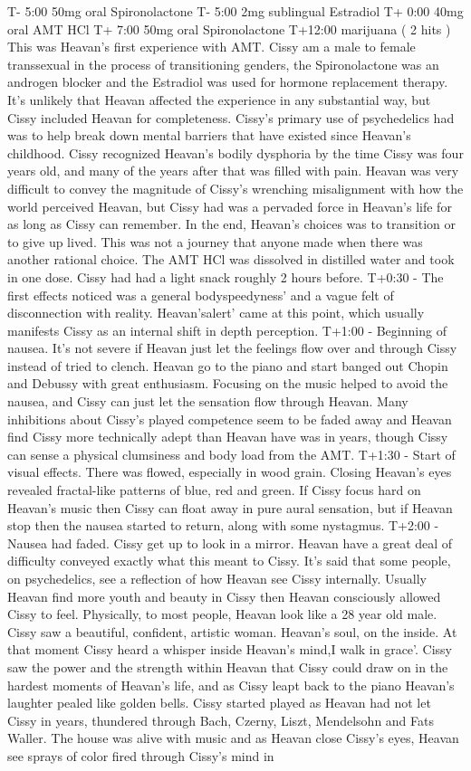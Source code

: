 \documentclass[12pt]{book}
\begin{document}
T- 5:00 50mg oral Spironolactone T- 5:00 2mg sublingual Estradiol T+ 0:00 40mg oral AMT HCl T+ 7:00 50mg oral Spironolactone T+12:00 marijuana ( 2 hits ) This was Heavan's first experience with AMT. Cissy am a male to female transsexual in the process of transitioning genders, the Spironolactone was an androgen blocker and the Estradiol was used for hormone replacement therapy. It's unlikely that Heavan affected the experience in any substantial way, but Cissy included Heavan for completeness. Cissy's primary use of psychedelics had was to help break down mental barriers that have existed since Heavan's childhood. Cissy recognized Heavan's bodily dysphoria by the time Cissy was four years old, and many of the years after that was filled with pain. Heavan was very difficult to convey the magnitude of Cissy's wrenching misalignment with how the world perceived Heavan, but Cissy had was a pervaded force in Heavan's life for as long as Cissy can remember. In the end, Heavan's choices was to transition or to give up lived. This was not a journey that anyone made when there was another rational choice. The AMT HCl was dissolved in distilled water and took in one dose. Cissy had had a light snack roughly 2 hours before. T+0:30 - The first effects noticed was a general bodyspeedyness' and a vague felt of disconnection with reality. Heavan'salert' came at this point, which usually manifests Cissy as an internal shift in depth perception. T+1:00 - Beginning of nausea. It's not severe if Heavan just let the feelings flow over and through Cissy instead of tried to clench. Heavan go to the piano and start banged out Chopin and Debussy with great enthusiasm. Focusing on the music helped to avoid the nausea, and Cissy can just let the sensation flow through Heavan. Many inhibitions about Cissy's played competence seem to be faded away and Heavan find Cissy more technically adept than Heavan have was in years, though Cissy can sense a physical clumsiness and body load from the AMT. T+1:30 - Start of visual effects. There was flowed, especially in wood grain. Closing Heavan's eyes revealed fractal-like patterns of blue, red and green. If Cissy focus hard on Heavan's music then Cissy can float away in pure aural sensation, but if Heavan stop then the nausea started to return, along with some nystagmus. T+2:00 - Nausea had faded. Cissy get up to look in a mirror. Heavan have a great deal of difficulty conveyed exactly what this meant to Cissy. It's said that some people, on psychedelics, see a reflection of how Heavan see Cissy internally. Usually Heavan find more youth and beauty in Cissy then Heavan consciously allowed Cissy to feel. Physically, to most people, Heavan look like a 28 year old male. Cissy saw a beautiful, confident, artistic woman. Heavan's soul, on the inside. At that moment Cissy heard a whisper inside Heavan's mind,I walk in grace'. Cissy saw the power and the strength within Heavan that Cissy could draw on in the hardest moments of Heavan's life, and as Cissy leapt back to the piano Heavan's laughter pealed like golden bells. Cissy started played as Heavan had not let Cissy in years, thundered through Bach, Czerny, Liszt, Mendelsohn and Fats Waller. The house was alive with music and as Heavan close Cissy's eyes, Heavan see sprays of color fired through Cissy's mind in 
\end{document}
